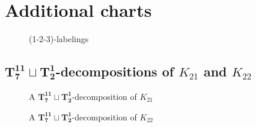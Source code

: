 \chapter{Additional charts}

    \begin{figure}[H]
    \scalebox{0.7}{}
    \end{figure}
    \newpage
    \begin{figure}[H]
    \scalebox{1}{}
    \caption{(1-2-3)-labelings}
    \end{figure} 

    \section{$\mathbf{T_{7}^{11}}\sqcup\mathbf{T_{2}^{1}}$-decompositions of $K_{21}$ and $K_{22}$}
    \begin{figure}[H]
        
        \caption{A $\mathbf{T_{7}^{11}}\sqcup\mathbf{T_{2}^{1}}$-decomposition of $K_{21}$}
        \label{fig:K21}
    \end{figure}
    \begin{figure}[H]
        
        \caption{A $\mathbf{T_{7}^{11}}\sqcup\mathbf{T_{2}^{1}}$-decomposition of $K_{22}$}
        \label{fig:K22}
    \end{figure}
    \newpage
